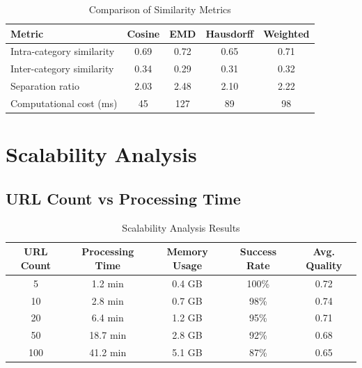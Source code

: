 \begin{table}[htbp]
    \centering
    \caption{Comparison of Similarity Metrics}
    \label{tab:similarity-metrics}
    \begin{tabular}{|l|c|c|c|c|}
        \hline
        \textbf{Metric} & \textbf{Cosine} & \textbf{EMD} & \textbf{Hausdorff} & \textbf{Weighted} \\
        \hline
        Intra-category similarity & 0.69 & 0.72 & 0.65 & 0.71 \\
        Inter-category similarity & 0.34 & 0.29 & 0.31 & 0.32 \\
        Separation ratio & 2.03 & 2.48 & 2.10 & 2.22 \\
        Computational cost (ms) & 45 & 127 & 89 & 98 \\
        \hline
    \end{tabular}
\end{table}

\section{Scalability Analysis}
\label{sec:scalability-analysis}

\subsection{URL Count vs Processing Time}
\label{subsec:url-scaling}

\begin{table}[htbp]
    \centering
    \caption{Scalability Analysis Results}
    \label{tab:scalability}
    \begin{tabular}{|c|c|c|c|c|}
        \hline
        \textbf{URL Count} & \textbf{Processing Time} & \textbf{Memory Usage} & \textbf{Success Rate} & \textbf{Avg. Quality} \\
        \hline
        5 & 1.2 min & 0.4 GB & 100\% & 0.72 \\
        10 & 2.8 min & 0.7 GB & 98\% & 0.74 \\
        20 & 6.4 min & 1.2 GB & 95\% & 0.71 \\
        50 & 18.7 min & 2.8 GB & 92\% & 0.68 \\
        100 & 41.2 min & 5.1 GB & 87\% & 0.65 \\
        \hline
    \end{tabular}
\end{table}


